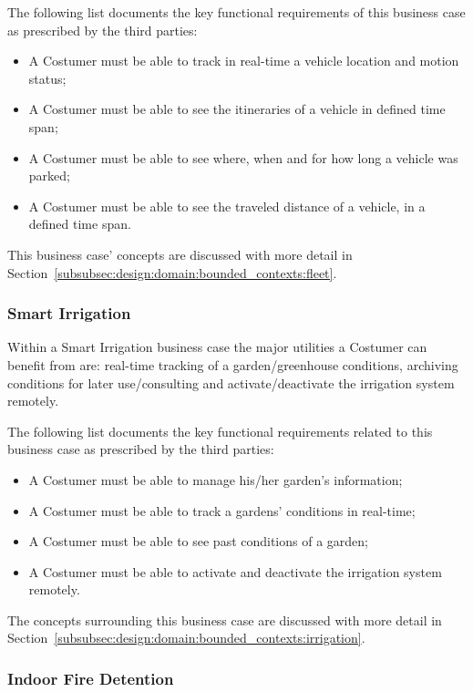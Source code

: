 The following list documents the key functional requirements of this business case as prescribed by the third parties:

\begin{itemize}
    \item A Costumer must be able to track in real-time a vehicle location and motion status;
    \item A Costumer must be able to see the itineraries of a vehicle in defined time span;
    \item A Costumer must be able to see where, when and for how long a vehicle was parked;
    \item A Costumer must be able to see the traveled distance of a vehicle, in a defined time span.
\end{itemize}

This business case' concepts are discussed with more detail in Section~\ref{subsubsec:design:domain:bounded_contexts:fleet}.

\subsubsection{Smart Irrigation}
\label{subsubsec:requirements:functional:services:irrigation}

Within a Smart Irrigation business case the major utilities a Costumer can benefit from are: real-time tracking of a garden/greenhouse conditions, archiving conditions for later use/consulting and activate/deactivate the irrigation system remotely.

The following list documents the key functional requirements related to this business case as prescribed by the third parties:

\begin{itemize}
    \item A Costumer must be able to manage his/her garden's information;
    \item A Costumer must be able to track a gardens' conditions in real-time;
    \item A Costumer must be able to see past conditions of a garden;
    \item A Costumer must be able to activate and deactivate the irrigation system remotely.
\end{itemize}

The concepts surrounding this business case are discussed with more detail in Section~\ref{subsubsec:design:domain:bounded_contexts:irrigation}.

\subsubsection{Indoor Fire Detention}
\label{subsubsec:requirements:functional:services:fire}

